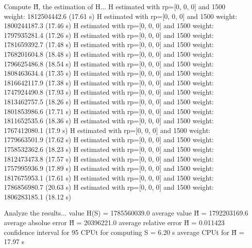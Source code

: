 Compute H̃, the estimation of H...
  H estimated with rp=[0, 0, 0] and 1500 weight:  1812504442.6  (17.61 s)
  H estimated with rp=[0, 0, 0] and 1500 weight:  1800244187.3  (17.46 s)
  H estimated with rp=[0, 0, 0] and 1500 weight:  1797935281.4  (17.26 s)
  H estimated with rp=[0, 0, 0] and 1500 weight:  1781659392.7  (17.48 s)
  H estimated with rp=[0, 0, 0] and 1500 weight:  1768201604.8  (18.48 s)
  H estimated with rp=[0, 0, 0] and 1500 weight:  1796625486.8  (18.54 s)
  H estimated with rp=[0, 0, 0] and 1500 weight:  1808463634.4  (17.35 s)
  H estimated with rp=[0, 0, 0] and 1500 weight:  1816642117.9  (17.38 s)
  H estimated with rp=[0, 0, 0] and 1500 weight:  1747924490.8  (17.93 s)
  H estimated with rp=[0, 0, 0] and 1500 weight:  1813462757.5  (18.26 s)
  H estimated with rp=[0, 0, 0] and 1500 weight:  1801853986.6  (17.71 s)
  H estimated with rp=[0, 0, 0] and 1500 weight:  1811652535.6  (18.36 s)
  H estimated with rp=[0, 0, 0] and 1500 weight:  1767412080.1  (17.9 s)
  H estimated with rp=[0, 0, 0] and 1500 weight:  1779663501.9  (17.62 s)
  H estimated with rp=[0, 0, 0] and 1500 weight:  1758532362.6  (18.23 s)
  H estimated with rp=[0, 0, 0] and 1500 weight:  1812473473.8  (17.57 s)
  H estimated with rp=[0, 0, 0] and 1500 weight:  1757995936.9  (17.89 s)
  H estimated with rp=[0, 0, 0] and 1500 weight:  1817675953.1  (17.61 s)
  H estimated with rp=[0, 0, 0] and 1500 weight:  1786856980.7  (20.63 s)
  H estimated with rp=[0, 0, 0] and 1500 weight:  1806283185.1  (18.12 s)

Analyze the results...
  value H(S)                  = 1785560039.0 
  average value H̃             = 1792203169.6 
  average absolue error H̃     = 20396221.0 
  average relative error H̃    = 0.011423 
  confidence interval for 95%
  CPUt for computing S         = 6.20 s
  average CPUt for H̃           = 17.97 s

